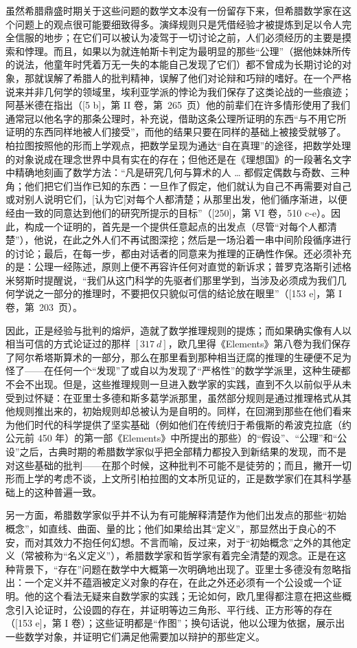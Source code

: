 虽然希腊鼎盛时期关于这些问题的数学文本没有一份留存下来，但希腊数学家在这个问题上的观点很可能要细致得多。演绎规则只是凭借经验才被提炼到足以令人完全信服的地步；在它们可以被认为凌驾于一切讨论之前，人们必须经历的主要是摸索和悖理。而且，如果以为就连帕斯卡判定为最明显的那些“公理”（据他妹妹所传的说法，他童年时凭着万无一失的本能自己发现了它们）都不曾成为长期讨论的对象，那就误解了希腊人的批判精神，误解了他们对论辩和巧辩的嗜好。在一个严格说来并非几何学的领域里，埃利亚学派的悖论为我们保存了这类论战的一些痕迹；阿基米德在指出（{[}5 b{]}，第 II 卷，第~265~页）他的前辈们在许多情形使用了我们通常冠以他名字的那条公理时，补充说，借助这条公理所证明的东西“与不用它所证明的东西同样地被人们接受”，而他的结果只要在同样的基础上被接受就够了。柏拉图按照他的形而上学观点，把数学呈现为通达“自在真理”的途径，把数学处理的对象说成在理念世界中具有实在的存在；但他还是在《理想国》的一段著名文字中精确地刻画了数学方法：“凡是研究几何与算术的人 \ldots{} 都假定偶数与奇数、三种角；他们把它们当作已知的东西：一旦作了假定，他们就认为自己不再需要对自己或对别人说明它们，{[}认为它{]}对每个人都清楚；从那里出发，他们循序渐进，以便经由一致的同意达到他们的研究所提示的目标”（{[}250{]}，第 VI 卷，510 c-e）。因此，构成一个证明的，首先是一个提供任意起点的出发点（尽管“对每个人都清楚”），他说，在此之外人们不再试图深挖；然后是一场沿着一串中间阶段循序进行的讨论；最后，在每一步，都由对话者的同意来为推理的正确性作保。还必须补充的是：公理一经陈述，原则上便不再容许任何对直觉的新诉求；普罗克洛斯引述格米努斯时提醒说，“我们从这门科学的先驱者们那里学到，当涉及必须成为我们几何学说之一部分的推理时，不要把仅只貌似可信的结论放在眼里”（{[}153 e{]}，第 I 卷，第~203~页）。

因此，正是经验与批判的熔炉，造就了数学推理规则的提炼；而如果确实像有人以相当可信的方式论证过的那样 \([317\ d]\)，欧几里得《Elements》第八卷为我们保存了阿尔希塔斯算术的一部分，那么在那里看到那种相当迂腐的推理的生硬便不足为怪了——在任何一个“发现”了或自以为发现了“严格性”的数学学派里，这种生硬都不会不出现。但是，这些推理规则一旦进入数学家的实践，直到不久以前似乎从未受到过怀疑：在亚里士多德和斯多葛学派那里，虽然部分规则是通过推理格式从其他规则推出来的，初始规则却总被认为是自明的。同样，在回溯到那些在他们看来为他们时代的科学提供了坚实基础（例如他们在传统归于希俄斯的希波克拉底（约公元前 450 年）的第一部《Elements》中所提出的那些）的“假设”、“公理”和“公设”之后，古典时期的希腊数学家似乎把全部精力都投入到新结果的发现，而不是对这些基础的批判——在那个时候，这种批判不可能不是徒劳的；而且，撇开一切形而上学的考虑不谈，上文所引柏拉图的文本所见证的，正是数学家们在其科学基础上的这种普遍一致。

另一方面，希腊数学家似乎并不认为有可能解释清楚作为他们出发点的那些“初始概念”，如直线、曲面、量的比；他们如果给出其“定义”，那显然出于良心的不安，而对其效力不抱任何幻想。不言而喻，反过来，对于“初始概念”之外的其他定义（常被称为“名义定义”），希腊数学家和哲学家有着完全清楚的观念。正是在这种背景下，“存在”问题在数学中大概第一次明确地出现了。亚里士多德没有忽略指出：一个定义并不蕴涵被定义对象的存在，在此之外还必须有一个公设或一个证明。他的这个看法无疑来自数学家的实践；无论如何，欧几里得都注意在把这些概念引入论证时，公设圆的存在，并证明等边三角形、平行线、正方形等的存在（{[}153 e{]}，第 I 卷）；这些证明都是“作图”；换句话说，他以公理为依据，展示出一些数学对象，并证明它们满足他需要加以辩护的那些定义。


